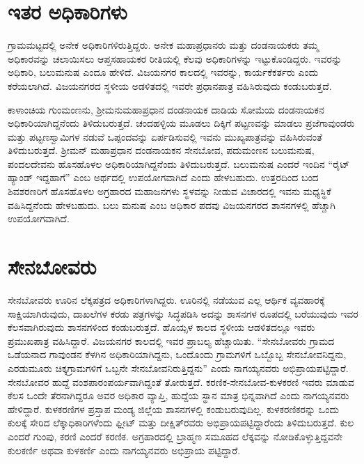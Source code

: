 \vskip 4pt

\section*{ಇತರ ಅಧಿಕಾರಿಗಳು}

ಗ್ರಾಮಮಟ್ಟದಲ್ಲಿ ಅನೇಕ ಅಧಿಕಾರಿಗಳಿರುತ್ತಿದ್ದರು. ಅನೇಕ ಮಹಾಪ್ರಧಾನರು ಮತ್ತು ದಂಡನಾಯಕರು ತಮ್ಮ ಅಧಿಕಾರವನ್ನು ಚಲಾಯಿಸಲು ಆಪ್ತಸಹಾಯಕರ ರೀತಿಯಲ್ಲಿ ಕೆಲವು ಅಧಿಕಾರಿಗಳನ್ನು ಇಟ್ಟುಕೊಂಡಿದ್ದರು. ಇವರನ್ನು ಅಧಿಕಾರಿ, ಬಲುಮನುಷ ಎಂದೂ ಹೇಳಿದೆ. ವಿಜಯನಗರ ಕಾಲದಲ್ಲಿ ಇವರನ್ನು, ಕಾರ್ಯಕೆಕರ್ತರು ಎಂದು ಕರೆಯಲಾಗಿದೆ. ವಿಜಯನಗರದ ಸ್ಥಳೀಯ ಅಡಳಿತದಲ್ಲಿ ಇವರೇ ಪ್ರಧಾನಪಾತ್ರ ವಹಿಸಿರುವುದು ಕಂಡುಬರುತ್ತದೆ.

\vskip 2pt

ಕಾಳಾಂಚಿಯ ಗುಂಮಂಣನು, ಶ‍್ರೀಮನುಮಹಾಪ್ರಧಾನ ದಂಡನಾಯಕ ದಾಡಿಯ ಸೋಮೆಯ ದಂಡನಾಯಕನ ಅಧಿಕಾರಿಯಾಗಿದ್ದನೆಂದು ತಿಳಿದುಬರುತ್ತದೆ. ಚಂದಹಳ್ಳಿಯ ಮೂಡಲು ದಿಕ್ಕಿಗೆ ಪಟ್ಟಣವನ್ನು ಮಾಡಲು ಪ್ರಜೆಗಾವುಂಡರು ಮತ್ತು ಪಟ್ಟಣಸ್ವಾಮಿಗಳ ನಡುವೆ ಒಪ್ಪಂದವನ್ನು ಏರ್ಪಡಿಸುವಲ್ಲಿ ಇವನು ಮುಖ್ಯಪಾತ್ರವನ್ನು ವಹಿಸಿರುವಂತೆ ತಿಳಿದುಬರುತ್ತದೆ. ಶ‍್ರೀಮನ್​ ಮಹಾಪ್ರಧಾನ ದಂಡನಾಯಕನ ಸೇನಬೋವ, ಪದುಮಂಣನ ಬಲುಮನುಷ, ಪಂದಲದೇವನು ಹೊಸಹೊಳಲ ಅಧಿಕಾರಿಯಾಗಿದ್ದನೆಂದು ತಿಳಿದುಬರುತ್ತದೆ. ಬಲುಮನುಷ ಎಂದರೆ ಇಂದಿನ “ರೈಟ್​ ಹ್ಯಾಂಡ್​ ಇದ್ದಹಾಗೆ” ಎಂಬ ಅರ್ಥದಲ್ಲಿ ಉಪಯೋಗವಾಗಿದೆ ಎಂದು ಹೇಳಬಹುದು. ಉತ್ತರದಿಂದ ಬಂದ ಶಿವಶರಣರಿಗೆ ಹೊಸಹೊಳಲ ಅಗ್ರಹಾರದ ಮಹಾಜನಗಳು ಸ್ಥಳವನ್ನು ನೀಡುವ ವಿಚಾರದಲ್ಲಿ ಇವನು ಮಧ್ಯಸ್ಥಿಕೆ ವಹಿಸಿದ್ದನೆಂದು ಹೇಳಬಹುದು. ಬಲು ಮನುಷ ಎಂಬ ಅಧಿಕಾರ ಪದವು ವಿಜಯನಗರದ ಶಾಸನಗಳಲ್ಲಿ ಹೆಚ್ಚಾಗಿ ಉಪಯೋಗವಾಗಿದೆ.

\vskip 2pt

\section*{ಸೇನಬೋವರು}

ಸೇನಬೋವರು ಊರಿನ ಲೆಕ್ಕಪತ್ರದ ಅಧಿಕಾರಿಗಳಾಗಿದ್ದರು. ಊರಿನಲ್ಲಿ ನಡೆಯುವ ಎಲ್ಲ ಆರ್ಥಿಕ ವ್ಯವಹಾರಕ್ಕೆ ಸಾಕ್ಷಿಯಾಗಿರುವುದು, ದಾಖಲೆಗಳ ಕರಡು ಪತ್ರಗಳನ್ನು ಸಿದ್ಧಪಡಿಸಿ ಅದನ್ನು ಶಾಸನಗಳ ರೂಪದಲ್ಲಿ ಬರೆಯುವುದು ಇವರ ಕೆಲಸವಾಗಿರುವುದು ಶಾಸನಗಳಿಂದ ಕಂಡುಬರುತ್ತದೆ. ಹೊಯ್ಸಳ ಕಾಲದ ಸ್ಥಳೀಯ ಆಡಳಿತದಲ್ಲೂ ಇವರು ಪ್ರಮುಖಪಾತ್ರ ವಹಿಸಿದ್ದಾರೆ. ವಿಜಯನಗರ ಕಾಲದಲ್ಲಿ ಇವರ ಪ್ರಾಬಲ್ಯ ಹೆಚ್ಚಾಯಿತು. “ಸೇನಬೋವರು ಗ್ರಾಮದ ಒಡೆಯನಾದ ಗಾವುಂಡನ ಕೆಳಗಿನ ಅಧಿಕಾರಿಯಾಗಿದ್ದನು, ಒಂದೊಂದು ಗ್ರಾಮಗಳಿಗೆ ಒಬ್ಬೊಬ್ಬ ಸೇನಬೋವನಿದ್ದನು, ಎರಡುಮೂರು ಚಿಕ್ಕಗ್ರಾಮಗಳಿಗೆ ಒಬ್ಬನೇ ಸೇನಬೋವನಿರುತ್ತಿದ್ದನು” ಎಂದು ನಾಗಯ್ಯನವರು ಅಭಿಪ್ರಾಯಪಟ್ಟಿದ್ದಾರೆ. ಸೇನಬೋವರ ಹುದ್ದೆ ವಂಶಪಾರಂಪರ್ಯವಾಗಿದ್ದಂತೆ ತೋರುತ್ತದೆ. ಕರಣಿಕ-ಸೇನಬೋವ-ಕುಳಕರಣಿ ಇವರು ಮಾಡುವ ಕೆಲಸ ಒಂದೇ ತೆರನಾಗಿದ್ದರೂ ಅವರ ಅಧಿಕಾರ ವ್ಯಾಪ್ತಿ, ಹುದ್ದೆಯ ಸ್ಥಾನ ಮಾತ್ರ ಭಿನ್ನವಾಗಿದೆ ಎಂದು ನಾಗಯ್ಯನವರು ಹೇಳಿದ್ದಾರೆ. ಕುಳಕರಣಿಗಳ ಪ್ರಸ್ತಾಪ ಮಂಡ್ಯ ಜಿಲ್ಲೆಯ ಶಾಸನಗಳಲ್ಲಿ ಕಂಡುಬರುವುದಿಲ್ಲ. ಕುಳಕರಣಿಕರನ್ನು ಒಂದು ಕುಲಕ್ಕೆ ಸೇರಿದ ಲೆಕ್ಕಾಧಿಕಾರಿಗಳೆಂದು ಫ್ಲೀಟ್​ ಮತ್ತು ದೀಕ್ಷಿತ್​ರವರು ಅಭಿಪ್ರಾಯಪಟ್ಟಿದ್ದಾರೆಂದು ತಿಳಿದುಬರುತ್ತದೆ. ಕುಲ ಎಂದರೆ ಗುಂಪು, ಕರಣಿ ಎಂದರೆ ಕರಣಿಕ. ಅಗ್ರಹಾರದಲ್ಲಿ ಬ್ರಾಹ್ಮಣ ಸಮೂಹದ ಲೆಕ್ಕವನ್ನು ನೋಡಿಕೊಳ್ಳುತ್ತಿದ್ದವನೇ ಕುಲಕರ್ಣಿ ಅಥವಾ ಕುಳಕರ್ಣಿ ಎಂದು ನಾಗಯ್ಯನವರು ಅಭಿಪ್ರಾಯ ಪಟ್ಟಿದ್ದಾರೆ.

